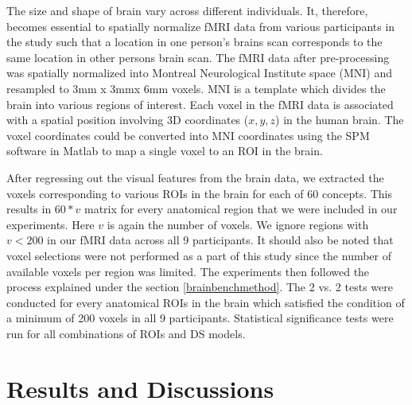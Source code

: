 The size and shape of brain vary across different individuals. It, therefore, becomes essential to spatially normalize fMRI data from various participants in the study such that a location in one person's brains scan corresponds to the same location in other persons brain scan. The fMRI data after pre-processing was spatially normalized into Montreal Neurological Institute space (MNI) and resampled to 3mm x 3mmx 6mm voxels. MNI is a  template which divides the brain into various regions of interest. Each voxel in the fMRI data is associated with a spatial position involving 3D coordinates ($x,y,z$) in the human brain. The voxel coordinates could be converted into MNI coordinates using the SPM software in Matlab to map a single voxel to an ROI in the brain.

After regressing out the visual features from the brain data, we extracted the voxels corresponding to various ROIs in the brain for each of 60 concepts. This results in $60*v$ matrix for every anatomical region that we were included in our experiments. Here $v$ is again the number of voxels. We ignore regions with $v < 200$ in our fMRI data across all 9 participants. It should also be noted that voxel selections were not performed as a part of this study since the number of available voxels per region was limited. The experiments then followed the process explained under the section \ref{brainbenchmethod}. The 2 vs. 2 tests were conducted for every anatomical ROIs in the brain which satisfied the condition of a minimum of 200 voxels in all 9 participants. Statistical significance tests were run for all combinations of ROIs and DS models.
\section{Results and Discussions}


